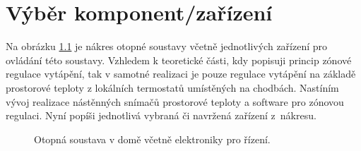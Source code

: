 \chapter{Výběr komponent/zařízení}

Na obrázku \ref{fig:otopna-soustava-a-elektronika-rez-domu} je nákres otopné soustavy včetně jednotlivých zařízení pro ovládání této soustavy. Vzhledem k teoretické části, kdy popisuji princip zónové regulace vytápění, tak v samotné realizaci je pouze regulace vytápění na základě prostorové teploty z lokálních termostatů umístěných na chodbách. Nastíním vývoj realizace nástěnných snímačů prostorové teploty a software pro zónovou regulaci. Nyní popíši jednotlivá vybraná či navržená zařízení z~nákresu. 

\newpage

\begin{figure}[H]
    \centering
    \def\svgwidth{\columnwidth}
    
    \caption{Otopná soustava v domě včetně elektroniky pro řízení.}
    \label{fig:otopna-soustava-a-elektronika-rez-domu}
\end{figure}


